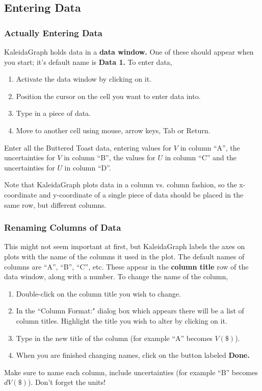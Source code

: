 \subsection {Entering Data}
\subsubsection {Actually Entering Data}

KaleidaGraph holds data in a {\bf data window.} One of these should
appear when you start; it's default name is {\bf Data 1.} To enter
data,

\noindent
\begin{enumerate}
\item Activate the data window by clicking on it.
\item Position the cursor on the cell you want to enter data into.
\item Type in a piece of data. 
\item Move to another cell using mouse, arrow keys, Tab or Return.
\end{enumerate}
Enter all the Buttered Toast data, entering values for $V$ in column ``A'',
the uncertainties for $V$ in column ``B'', the values for $U$ in column ``C'' 
and the uncertainties for $U$ in column ``D''.

\indent

Note that KaleidaGraph plots data in a column vs. column fashion, so
the x-coordinate and y-coordinate of a single piece of data should be
placed in the same row, but different columns.

\subsubsection{Renaming Columns of Data}

This might not seem important at first, but KaleidaGraph labels the
axes on plots with the name of the columns it used in the plot. The
default names of columns are ``A'', ``B'', ``C'', etc. These appear in
the {\bf column title} row of the data window, along with a number. To
change the name of the column,

\noindent
\begin{enumerate}
\item Double-click on the column title you wish to change.
\item In the ``Column Format:" dialog box which appears there will be a list of column 
titles. Highlight the title you wish to alter by clicking on it.
\item Type in the new title of the column (for example ``A'' becomes $V(\$)$).
\item When you are finished changing names, click on the button labeled 
{\bf Done.}
\end{enumerate}
Make sure to name each column, include uncertainties (for example
``B'' becomes $dV(\$)$).  Don't forget the units!
\indent

